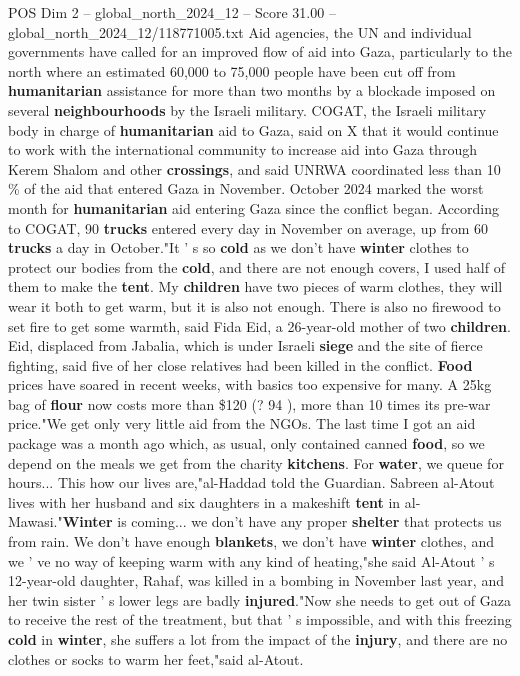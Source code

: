 \begin{textsample}{POS Dim 2 – global\_north\_2024\_12 – Score 31.00 – global\_north\_2024\_12/118771005.txt}
Aid agencies, the UN and individual governments have called for an improved flow of aid into Gaza, particularly to the north where an estimated 60,000 to 75,000 people have been cut off from \textbf{humanitarian} assistance for more than two months by a blockade imposed on several \textbf{neighbourhoods} by the Israeli military.
COGAT, the Israeli military body in charge of \textbf{humanitarian} aid to Gaza, said on X that it would continue to work with the international community to increase aid into Gaza through Kerem Shalom and other \textbf{crossings}, and said UNRWA coordinated less than 10 \% of the aid that entered Gaza in November.
October 2024 marked the worst month for \textbf{humanitarian} aid entering Gaza since the conflict began.
According to COGAT, 90 \textbf{trucks} entered every day in November on average, up from 60 \textbf{trucks} a day in October."It ' s so \textbf{cold} as we don't have \textbf{winter} clothes to protect our bodies from the \textbf{cold}, and there are not enough covers, I used half of them to make the \textbf{tent}.
My \textbf{children} have two pieces of warm clothes, they will wear it both to get warm, but it is also not enough.
There is also no firewood to set fire to get some warmth, said Fida Eid, a 26-year-old mother of two \textbf{children}.
Eid, displaced from Jabalia, which is under Israeli \textbf{siege} and the site of fierce fighting, said five of her close relatives had been killed in the conflict. \textbf{Food} prices have soared in recent weeks, with basics too expensive for many.
A 25kg bag of \textbf{flour} now costs more than \$120 (? 94 ), more than 10 times its pre-war price."We get only very little aid from the NGOs.
The last time I got an aid package was a month ago which, as usual, only contained canned \textbf{food}, so we depend on the meals we get from the charity \textbf{kitchens}.
For \textbf{water}, we queue for hours...
This how our lives are,"al-Haddad told the Guardian.
Sabreen al-Atout lives with her husband and six daughters in a makeshift \textbf{tent} in al-Mawasi."\textbf{Winter} is coming... we don't have any proper \textbf{shelter} that protects us from rain.
We don't have enough \textbf{blankets}, we don't have \textbf{winter} clothes, and we ' ve no way of keeping warm with any kind of heating,"she said Al-Atout ' s 12-year-old daughter, Rahaf, was killed in a bombing in November last year, and her twin sister ' s lower legs are badly \textbf{injured}."Now she needs to get out of Gaza to receive the rest of the treatment, but that ' s impossible, and with this freezing \textbf{cold} in \textbf{winter}, she suffers a lot from the impact of the \textbf{injury}, and there are no clothes or socks to warm her feet,"said al-Atout.

\end{textsample}
